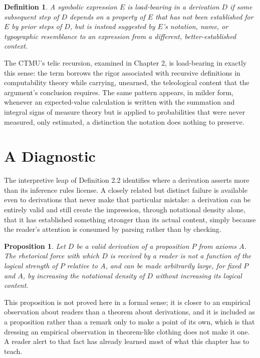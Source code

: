 \documentclass[11pt]{book}
\newtheorem{definition}[theorem]{Definition}
\newtheorem{proposition}[theorem]{Proposition}
\begin{document}
\begin{definition}
A symbolic expression $E$ is \emph{load-bearing} in a derivation $D$ if some subsequent step of $D$ depends on a property of $E$ that has not been established for $E$ by prior steps of $D$, but is instead suggested by $E$'s notation, name, or typographic resemblance to an expression from a different, better-established context.
\end{definition}

The CTMU's telic recursion, examined in Chapter 2, is load-bearing in exactly this sense: the term borrows the rigor associated with recursive definitions in computability theory while carrying, unearned, the teleological content that the argument's conclusion requires. The same pattern appears, in milder form, whenever an expected-value calculation is written with the summation and integral signs of measure theory but is applied to probabilities that were never measured, only estimated, a distinction the notation does nothing to preserve.

\section{A Diagnostic}

The interpretive leap of Definition 2.2 identifies where a derivation asserts more than its inference rules license. A closely related but distinct failure is available even to derivations that never make that particular mistake: a derivation can be entirely valid and still create the impression, through notational density alone, that it has established something stronger than its actual content, simply because the reader's attention is consumed by parsing rather than by checking.

\begin{proposition}
Let $D$ be a valid derivation of a proposition $P$ from axioms $A$. The rhetorical force with which $D$ is received by a reader is not a function of the logical strength of $P$ relative to $A$, and can be made arbitrarily large, for fixed $P$ and $A$, by increasing the notational density of $D$ without increasing its logical content.
\end{proposition}

This proposition is not proved here in a formal sense; it is closer to an empirical observation about readers than a theorem about derivations, and it is included as a proposition rather than a remark only to make a point of its own, which is that dressing an empirical observation in theorem-like clothing does not make it one. A reader alert to that fact has already learned most of what this chapter has to teach.
\end{document}
